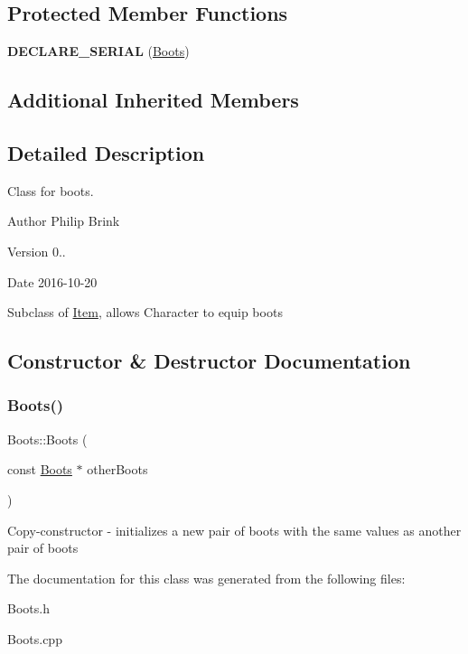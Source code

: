 \subsection*{Protected Member Functions}
\begin{DoxyCompactItemize}
\item 
\hypertarget{class_boots_a067d801af4bd7abb26c9f11970246ed8}{}\label{class_boots_a067d801af4bd7abb26c9f11970246ed8} 
{\bfseries D\+E\+C\+L\+A\+R\+E\+\_\+\+S\+E\+R\+I\+AL} (\hyperlink{class_boots}{Boots})
\end{DoxyCompactItemize}
\subsection*{Additional Inherited Members}


\subsection{Detailed Description}
Class for boots. 

\begin{DoxyAuthor}{Author}
Philip Brink 
\end{DoxyAuthor}
\begin{DoxyVersion}{Version}
0.. 
\end{DoxyVersion}
\begin{DoxyDate}{Date}
2016-\/10-\/20
\end{DoxyDate}
Subclass of \hyperlink{class_item}{Item}, allows Character to equip boots 

\subsection{Constructor \& Destructor Documentation}
\hypertarget{class_boots_ad3452c78ef60ba4d955e779560d5e5ba}{}\label{class_boots_ad3452c78ef60ba4d955e779560d5e5ba} 
\subsubsection{\texorpdfstring{Boots()}{Boots()}}
{\footnotesize\ttfamily Boots\+::\+Boots (\begin{DoxyParamCaption}\item[{const \hyperlink{class_boots}{Boots} $\ast$}]{other\+Boots }\end{DoxyParamCaption})}

Copy-\/constructor -\/ initializes a new pair of boots with the same values as another pair of boots 

The documentation for this class was generated from the following files\+:\begin{DoxyCompactItemize}
\item 
Boots.\+h\item 
Boots.\+cpp\end{DoxyCompactItemize}
